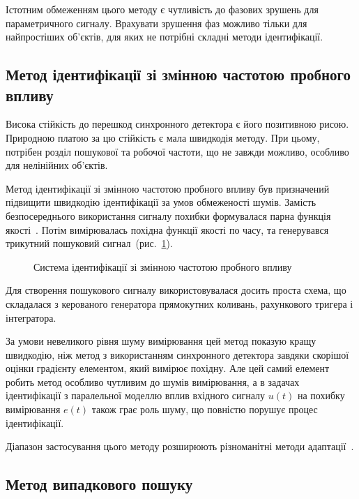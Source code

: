 Істотним обмеженням цього методу є чутливість до фазових
зрушень для параметричного сигналу. Врахувати зрушення фаз
можливо тільки для найпростіших об'єктів, для
яких не потрібні складні методи ідентифікації.


\subsection{Метод ідентифікації зі змінною частотою пробного впливу} %

Висока стійкість до перешкод синхронного детектора є його
позитивною рисою. Природною платою за цю стійкість є мала
швидкодія методу.
При цьому, потрібен розділ пошукової та робочої частоти, що не
завжди можливо, особливо для нелінійних об'єктів.


Метод ідентифікації зі змінною частотою пробного впливу
був призначений підвищити швидкодію ідентифікації
за умов обмеженості шумів.
Замість безпосереднього використання сигналу похибки формувалася
парна функція якості~\cite{adopt_cont_sys,rastr_adop_complex_sys}.
Потім вимірювалась похідна функції якості по часу,
та генерувався трикутний пошуковий сигнал~(рис.~\ref{atu:f:varfreq}).


\begin{figure}[htb!]
\begin{center}

\end{center}
\caption{Система ідентифікації зі змінною частотою пробного впливу}
\label{atu:f:varfreq}
\end{figure}

Для створення пошукового сигналу використовувалася досить
проста схема,
що складалася з керованого генератора прямокутних коливань,
рахункового тригера і інтегратора.

За умови невеликого рівня шуму вимірювання
цей метод показую кращу швидкодію,
ніж метод з використанням синхронного детектора
завдяки скорішої оцінки градієнту елементом,
який вимірює похідну.
Але цей самий елемент
робить метод особливо чутливим до шумів вимірювання, а в
задачах ідентифікації з паралельної моделлю вплив вхідного
сигналу \(u(t)\) на похибку вимірювання \(e (t) \) також
грає роль шуму, що повністю порушує процес ідентифікації.

Діапазон застосування цього методу розширюють різноманітні
методи адаптації~\cite{auto_optim_intask}.


\subsection{Метод випадкового пошуку}%

